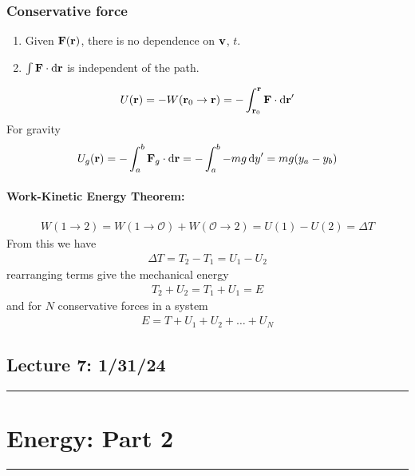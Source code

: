 \documentclass[../main.tex]{subfiles}
\begin{document}
\subsubsection*{Conservative force}
\begin{enumerate}
    \item Given $\vb{F}(\vb{r})$, there is no dependence on $\vb{v}$, $t$.
    \item $\int \vb{F} \cdot \dd{\vb{r}}$ is independent of the path.
\end{enumerate}
\begin{align*}
    U(\vb{r}) = -W (\vb{r}_0 \to \vb{r}) = -\int_{\vb{r}_0}^{\vb{r}} \vb{F} \cdot \dd{\vb{r}}'
\end{align*}
For gravity
\begin{align*}
    U_g (\vb{r}) = - \int_a^b \vb{F}_g \cdot \dd{\vb{r}} = - \int_a^b -mg \dd{y}' = mg(y_a - y_b)
\end{align*}
\paragraph{Work-Kinetic Energy Theorem:}
\begin{align*}
    W(1 \to 2) = W(1 \to \mathcal{O}) + W(\mathcal{O} \to 2) = U(1) - U(2) = \Delta T
\end{align*}
From this we have
\begin{align*}
    \Delta T = T_2 - T_1 = U_1 - U_2
\end{align*}
rearranging terms give the mechanical energy
\begin{align*}
    T_2 + U_2 = T_1 + U_1 = E
\end{align*}
and for $N$ conservative forces in a system
\begin{align*}
    E = T + U_1 + U_2 + \dots + U_N
\end{align*}

\pagebreak
\subsection*{Lecture 7: \hfill  1/31/24}
\hrule \vspace{10px}
\section*{Energy: Part 2}
\hrule \vspace{10px}
\end{document}
